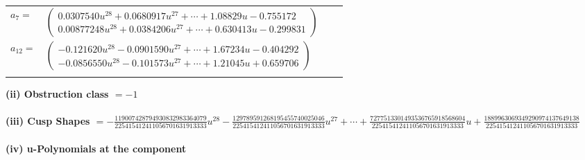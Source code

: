 \documentclass[1p]{elsarticle_modified}
\theoremstyle{definition}
\begin{document}
\begin{tabular}{m{7pt} m{180pt} m{7pt} m{180pt} }
\flushright $a_{7}=$&$\begin{pmatrix}0.0307540 u^{28}+0.0680917 u^{27}+\cdots+1.08829 u-0.755172\\0.00877248 u^{28}+0.0384206 u^{27}+\cdots+0.630413 u-0.299831\end{pmatrix}$ \\
\flushright $a_{12}=$&$\begin{pmatrix}-0.121620 u^{28}-0.0901590 u^{27}+\cdots+1.67234 u-0.404292\\-0.0856550 u^{28}-0.101573 u^{27}+\cdots+1.21045 u+0.659706\end{pmatrix}$\\&\end{tabular}
\flushleft \textbf{(ii) Obstruction class $= -1$}\\~\\
\flushleft \textbf{(iii) Cusp Shapes $= -\frac{119007428794930832983364079}{225415412411056701631913333} u^{28}-\frac{129789591268195455740025046}{225415412411056701631913333} u^{27}+\cdots+\frac{7277513301493536765918568604}{225415412411056701631913333} u+\frac{1889963069349290974137649138}{225415412411056701631913333}$}\\~\\
\newpage\renewcommand{\arraystretch}{1}
\flushleft \textbf{(iv) u-Polynomials at the component}\newline \\
\end{document}
